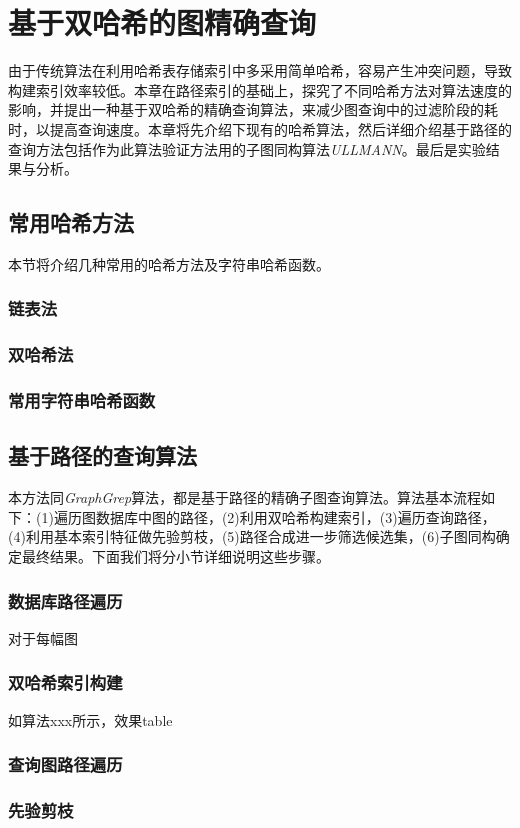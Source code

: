 \documentclass{XDBAthesis}
\begin{document}
\else
\fi
\chapter{基于双哈希的图精确查询}
\label{chap:graphgrep}
由于传统算法在利用哈希表存储索引中多采用简单哈希，容易产生冲突问题，导致构建索引效率较低。本章在路径索引的基础上，探究了不同哈希方法对算法速度的影响，并提出一种基于双哈希的精确查询算法，来减少图查询中的过滤阶段的耗时，以提高查询速度。本章将先介绍下现有的哈希算法，然后详细介绍基于路径的查询方法包括作为此算法验证方法用的子图同构算法\emph{ULLMANN}\cite{ullmann}。最后是实验结果与分析。

\section{常用哈希方法}
本节将介绍几种常用的哈希方法及字符串哈希函数。
\subsection{链表法}
\subsection{双哈希法}
\subsection{常用字符串哈希函数}

\section{基于路径的查询算法}
本方法同\emph{GraphGrep}算法\cite{graphgrep}，都是基于路径的精确子图查询算法。算法基本流程如下：(1)遍历图数据库中图的路径，(2)利用双哈希构建索引，(3)遍历查询路径，(4)利用基本索引特征做先验剪枝，(5)路径合成进一步筛选候选集，(6)子图同构确定最终结果。下面我们将分小节详细说明这些步骤。
\subsection{数据库路径遍历}
对于每幅图
\subsection{双哈希索引构建}
如算法xxx所示，效果table
\subsection{查询图路径遍历}
\subsection{先验剪枝}
\end{document}
